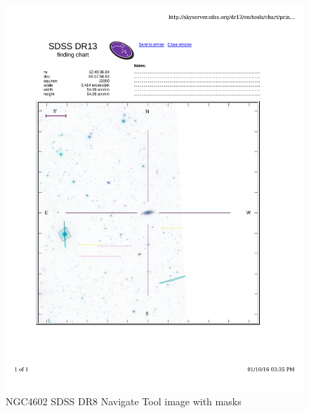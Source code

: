 \documentclass[10pt,letterpaper]{article}
\begin{document}
\begin{figure}[h!]
\centering
\includegraphics[scale=0.7]{figures/NGC4602.pdf}
\caption{NGC4602 SDSS DR8 Navigate Tool image with masks}
\end{figure}
\end{document}
